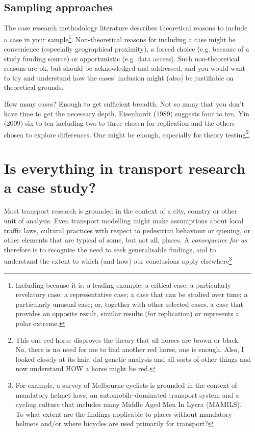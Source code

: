 \documentclass{tufte-handout}
\begin{document}
\subsection{Sampling approaches}
The case research methodology literature describes theoretical reasons to include a case in your sample\footnote{Including because it is: a leading example; a critical case; a particularly revelatory case; a representative case; a case that can be studied over time; a particularly unusual case; or, together with other selected cases, a case that provides an opposite result, similar results (for replication) or represents a polar extreme.}. Non-theoretical reasons for including a case might be convenience (especially geographical proximity), a forced choice (e.g. because of a study funding source) or opportunistic (e.g. data access)\cite{Eisenhardt1989aa, Meredith1998aa, Stuart2002aa, Voss2002aa,}. Such non-theoretical reasons are ok, but should be acknowledged and addressed, and you would want to try and understand how the cases' inclusion might (also) be justifiable on theoretical grounds.  

How many cases?  Enough to get sufficient breadth.  Not so many that you don't have time to get the necessary depth. Eisenhardt (1989) suggests four to ten, Yin (2009) six to ten including two to three chosen for replication and the others chosen to explore differences. One might be enough, especially for theory testing\footnote{This one red horse disproves the theory that all horses are brown or black.  No, there is no need for me to find another red horse, one is enough. Also, I looked closely at its hair, did genetic analysis and all sorts of other things and now understand HOW a horse might be red.}.


\section{Is everything in transport research a case study?}
Most transport research is grounded in the context of a city, country or other unit of analysis. Even transport modelling might make assumptions about local traffic laws, cultural practices with respect to pedestrian behaviour or queuing, or other elements that are typical of some, but not all, places.  A \emph{consequence for us} therefore is to recognise the need to seek generalisable findings, and to understand the extent to which (and how) our conclusions apply elsewhere\footnote{For example, a survey of Melbourne cyclists is grounded in the context of mandatory helmet laws, an automobile-dominated transport system  and a cycling culture that includes many Middle Aged Men In Lycra (MAMILS). To what extent are the findings applicable to places without mandatory helmets and/or where bicycles are used primarily for transport?}
\end{document}
